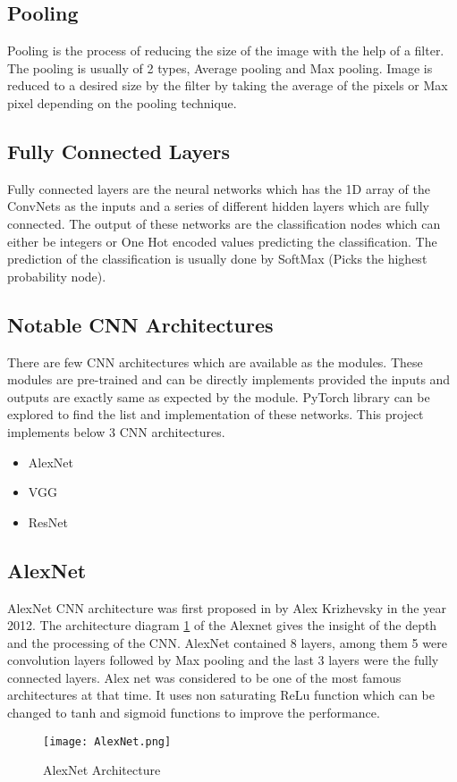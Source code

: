 \subsection{Pooling}
Pooling is the process of reducing the size of the image with the help of a filter. The pooling is usually of 2 types, Average pooling and Max pooling. Image is reduced to a desired size by the filter by taking the average of the pixels or Max pixel depending on the pooling technique.
\subsection{Fully Connected Layers}
Fully connected layers are the neural networks which has the 1D array of the ConvNets as the inputs and a series of different hidden layers which are fully connected. The output of these networks are the classification nodes which can either be integers or One Hot encoded values predicting the classification. The prediction of the classification is usually done by SoftMax (Picks the highest probability node).
\subsection{Notable CNN Architectures}
There are few CNN architectures which are available as the modules. These modules are pre-trained and can be directly implements provided the inputs and outputs are exactly same as expected by the module. PyTorch library can be explored to find the list and implementation of these networks. This project implements below 3 CNN architectures.
\begin{itemize}
	\item AlexNet
	\item VGG
	\item ResNet
\end{itemize}
\subsection{AlexNet}
AlexNet CNN architecture was first proposed in \cite{krizhevsky2012imagenet} by Alex Krizhevsky in the year 2012. The architecture diagram \ref{fig:AlexNet} of the Alexnet gives the insight of the depth and the processing of the CNN. AlexNet contained 8 layers, among them 5 were convolution layers followed by Max pooling and the last 3 layers were the fully connected layers. Alex net was considered to be one of the most famous architectures at that time. It uses non saturating ReLu function which can be changed to tanh and sigmoid functions to improve the performance.
\begin{figure}[tb]
	\center\texttt{[image: AlexNet.png]}
	\caption{AlexNet Architecture}
	\label{fig:AlexNet}
\end{figure}

